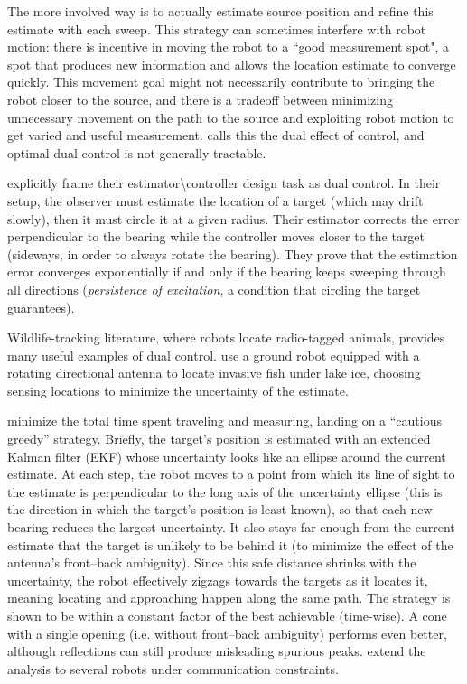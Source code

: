The more involved way is to actually estimate source position and refine this estimate with each sweep. This strategy can sometimes interfere with robot motion: there is incentive in moving the robot to a ``good measurement spot", a spot that produces new information and allows the location estimate to converge quickly. This movement goal might not necessarily contribute to bringing the robot closer to the source, and there is a tradeoff between minimizing unnecessary movement on the path to the source and exploiting robot motion to get varied and useful measurement. \citet{feldbaum1960dual} calls this the dual effect of control, and optimal dual control is not generally tractable.

\citet{deghat2014localization} explicitly frame their estimator\textbackslash controller design task as dual control. In their setup, the observer must estimate the location of a target (which may drift slowly), then it must circle it at a given radius. Their estimator corrects the error perpendicular to the bearing while the controller moves closer to the target (sideways, in order to always rotate the bearing). They prove that the estimation error converges exponentially if and only if the bearing keeps sweeping through all directions (\emph{persistence of excitation}, a condition that circling the target guarantees).

Wildlife-tracking literature, where robots locate radio-tagged animals, provides many useful examples of dual control. \citet{tokekar2011active} use a ground robot equipped with a rotating directional antenna to locate invasive fish under lake ice, choosing sensing locations to minimize the
uncertainty of the estimate. 

\citet{vanderhook2014cautious} minimize
the total time spent traveling and measuring, landing on a ``cautious greedy'' strategy. Briefly, the target's position is estimated with an extended Kalman filter (EKF) whose uncertainty looks like an ellipse around the current estimate. At each step, the robot moves to a point
from which its line of sight to the estimate is perpendicular to the long axis of the uncertainty ellipse (this is the direction in which the target's position is least known), so that each new bearing reduces the largest uncertainty. It also stays far enough from the current estimate that the target
is unlikely to be behind it (to minimize the effect of the antenna's front--back ambiguity). Since this safe distance shrinks with the uncertainty, the robot effectively zigzags towards the targets as it locates it, meaning locating and approaching happen along the same path. The strategy is shown to be within a constant factor of the best achievable (time-wise). A cone with a single opening (i.e. without front--back ambiguity) performs even better, although reflections can still produce misleading
spurious peaks.
\citet{vanderhook2015algorithms} extend the analysis to several robots under communication constraints.

